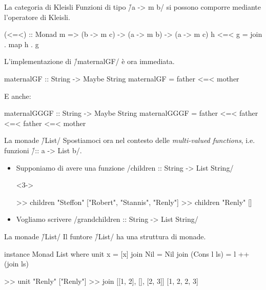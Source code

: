 \begin{frame}[fragile]{\secname}{La categoria di Kleisli}
Funzioni di tipo \h/a -> m b/ si possono comporre mediante l'operatore di Kleisli.
\pause

\begin{haskellcode}
(<=<) :: Monad m =>
    (b -> m c) -> (a -> m b) -> (a -> m c)
h <=< g = join . map h . g
\end{haskellcode}
\pause

L'implementazione di \h/maternalGF/ è ora immediata.

\begin{haskellcode}
maternalGF :: String -> Maybe String
maternalGF = father <=< mother
\end{haskellcode}
\pause

E anche:

\begin{haskellcode}
maternalGGGF :: String -> Maybe String
maternalGGGF =
    father <=< father <=< father <=< mother
\end{haskellcode}
\end{frame}

\begin{frame}[fragile]{\secname}{La monade \h/List/}
Spostiamoci ora nel contesto delle \emph{multi-valued functions}, i.e. funzioni \h/:: a -> List b/.
\begin{itemize}
\item<2-> Supponiamo di avere una funzione
\haskell/children :: String -> List String/

\begin{onslide}<3->
\begin{runhaskell}
>>  children "Steffon"
    ["Robert", "Stannis", "Renly"]
>>  children "Renly"
    []
\end{runhaskell}
\end{onslide}
\item<4> Vogliamo scrivere
\haskell/grandchildren :: String -> List String/
\end{itemize}
\end{frame}

\begin{frame}[fragile]{\secname}{La monade \h/List/}
Il funtore \h/List/ ha una struttura di monade.
\pause

\begin{haskellcode}
instance Monad List where
    unit x = [x]
    join Nil = Nil
    join (Cons l ls) = l ++ (join ls)
\end{haskellcode}
\pause

\begin{runhaskell}
>>  unit "Renly"
    ["Renly"]
>>  join [[1, 2], [], [2, 3]]
    [1, 2, 2, 3]
\end{runhaskell}
\end{frame}


